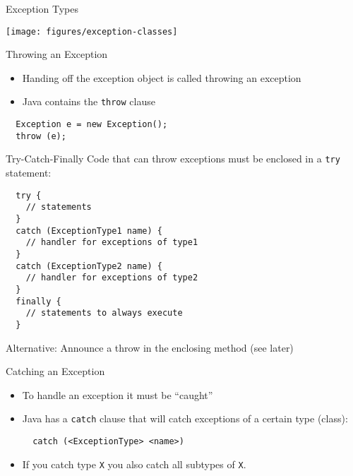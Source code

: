 \begin{frame}{Exception Types}
  \begin{center}
    \texttt{[image: figures/exception-classes]}
  \end{center}  
\end{frame}

\begin{frame}[fragile]{Throwing an Exception}
  \begin{itemize}
  \item Handing off the exception object is called throwing an
    exception
  \item Java contains the \lstinline!throw! clause
  \end{itemize}


  \begin{lstlisting}
  Exception e = new Exception();
  throw (e);
  \end{lstlisting}
\end{frame}

\begin{frame}[fragile]{Try-Catch-Finally}
  Code that can throw exceptions must be enclosed in a \lstinline!try! 
  statement:
  \begin{lstlisting}
  try {
    // statements
  } 
  catch (ExceptionType1 name) {
    // handler for exceptions of type1
  } 
  catch (ExceptionType2 name) {
    // handler for exceptions of type2
  } 
  finally {
    // statements to always execute
  }
  \end{lstlisting}
  Alternative: Announce a throw in the enclosing method (see later)
\end{frame}

\begin{frame}[fragile]{Catching an Exception}
  \begin{itemize}
  \item To handle an exception it must be ``caught''
  \item Java has a \lstinline!catch! clause that will catch exceptions
    of a certain type (class):
    \begin{lstlisting}
  catch (<ExceptionType> <name>)
    \end{lstlisting}
  \item If you catch type \lstinline!X! you also catch all subtypes of
    \lstinline!X!.
  \end{itemize}
\end{frame}

